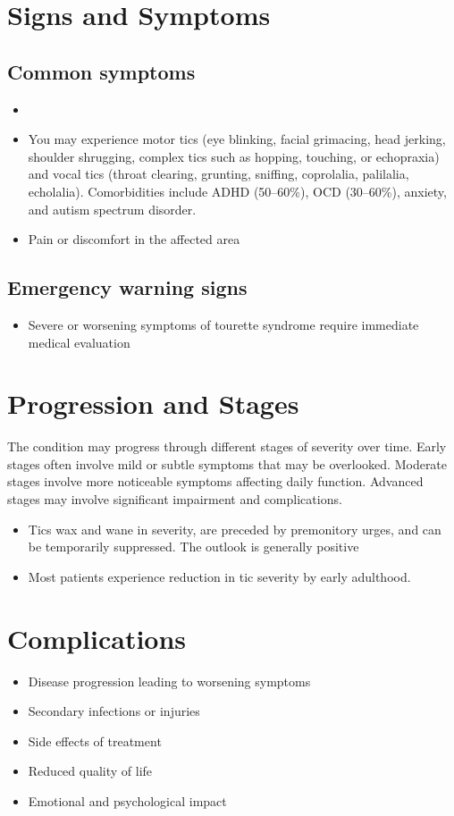 \section{Signs and Symptoms}

\subsection{Common symptoms}
\begin{itemize}[noitemsep]
  \item \item You may experience motor tics (eye blinking, facial grimacing, head jerking, shoulder shrugging, complex tics such as hopping, touching, or echopraxia) and vocal tics (throat clearing, grunting, sniffing, coprolalia, palilalia, echolalia). Comorbidities include ADHD (50--60\%), OCD (30--60\%), anxiety, and autism spectrum disorder.

  \item Pain or discomfort in the affected area
  \end{itemize}

\subsection{Emergency warning signs}
\begin{itemize}[noitemsep]
  \item Severe or worsening symptoms of tourette syndrome require immediate medical evaluation
\end{itemize}
\section{Progression and Stages}
The condition may progress through different stages of severity over time. Early stages often involve mild or subtle symptoms that may be overlooked. Moderate stages involve more noticeable symptoms affecting daily function. Advanced stages may involve significant impairment and complications.

\begin{itemize}[noitemsep]
  \item Tics wax and wane in severity, are preceded by premonitory urges, and can be temporarily suppressed. The outlook is generally positive
  \item Most patients experience reduction in tic severity by early adulthood.
\end{itemize}
\section{Complications}
\begin{itemize}[noitemsep]
  \item Disease progression leading to worsening symptoms
  \item Secondary infections or injuries
  \item Side effects of treatment
  \item Reduced quality of life
  \item Emotional and psychological impact
\end{itemize}
